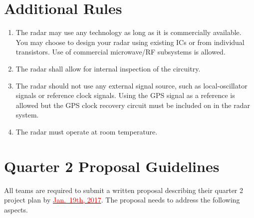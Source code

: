 \documentclass[letterpaper, 11pt]{article}
\newcommand{\due}[1]{\href{https://github.com/ucdart/UCD-EEC134/blob/master/support/schedule/eec134-schedule.pdf}{\textcolor{red}{#1}}}
\begin{document}
%	
%

\section{Additional Rules}
	\begin{enumerate}[itemsep=-0.1ex]
		
		\item The radar may use any technology as long as it is commercially available. You may choose to design your radar using existing ICs or from individual transistors. Use of commercial microwave/RF subsystems is allowed.
		
		\item The radar shall allow for internal inspection of the circuitry.
		
		\item The radar should not use any external signal source, such as local-oscillator signals or reference clock signals. Using the GPS signal as a reference is allowed but the GPS clock recovery circuit must be included on in the radar system.
		
		\item The radar must operate at room temperature. 		
	\end{enumerate}

\section{Quarter 2 Proposal Guidelines}

All teams are required to submit a written proposal describing their quarter 2 project plan by \due{Jan.~19th, 2017}. The proposal needs to address the following aspects.
\end{document}
